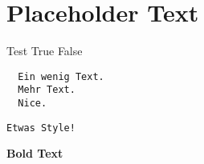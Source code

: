 
\section{Placeholder Text}

Test True False


\begin{Verbatim}
  Ein wenig Text.
  Mehr Text.
  Nice.
\end{Verbatim}

\begin{Verbatim}[frame=single, label=\textit{N}\textbf{ice}!, 
       labelposition=topline, formatcom=\color{orange}, 
       framesep=2mm, framerule=2mm, fontseries=b]
  Etwas Style!
\end{Verbatim}

\textbf{Bold Text}
